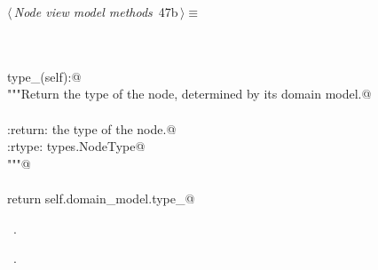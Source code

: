 \documentclass[
    a4paper,      %
    10pt,         %
    openright,    %
    notitlepage,  %
    parskip=half, %
]{scrreprt}       %
\theoremstyle{definition}                    %
\begin{document}
\begin{flushleft} \small
\begin{minipage}{\linewidth}\label{scrap61}\raggedright\small
{} $\langle\,${\itshape Node view model methods}\nobreak\ {\footnotesize {47b}}$\,\rangle\equiv$
\vspace{-1exm}
\begin{list}{}{} \item
\mbox{}\lstinline@@\\
\mbox{}\lstinline@property@\\
\mbox{}\lstinline@def type_(self):@\\
\mbox{}\lstinline@    """Return the type of the node, determined by its domain model.@\\
\mbox{}\lstinline@@\\
\mbox{}\lstinline@    :return: the type of the node.@\\
\mbox{}\lstinline@    :rtype: types.NodeType@\\
\mbox{}\lstinline@    """@\\
\mbox{}\lstinline@@\\
\mbox{}\lstinline@    return self.domain_model.type_@\\
\mbox{}\lstinline@@{\NWsep}
\end{list}
\vspace{-1.5ex}
\footnotesize
\begin{list}{}{\setlength{\itemsep}{-\parsep}\setlength{\itemindent}{-\leftmargin}}
\item \NWtxtMacroDefBy\ .
\item \NWtxtMacroRefIn\ .

\item{}
\end{list}
\end{minipage}\vspace{4ex}
\end{flushleft}
\end{document}
